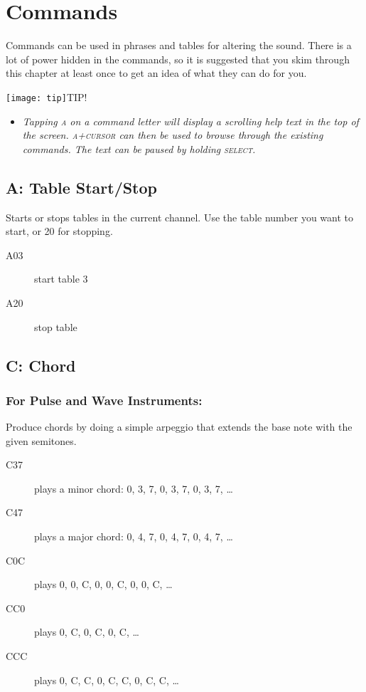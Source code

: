 \chapter{Commands}

Commands can be used in phrases and tables for altering the sound. There is a lot of power hidden in the commands, so it is suggested that you skim through this chapter at least once to get an idea of what they can do for you.

\texttt{[image: tip]}TIP!
\begin{itemize}
        \item \textit{Tapping \textsc{a} on a command letter will display a scrolling help text in the top of the screen. \textsc{a+cursor} can then be used to browse through the existing commands. The text can be paused by holding \textsc{select}.}
	\end{itemize}

\section{A: Table Start/Stop}

Starts or stops tables in the current channel. Use the table number you want to start, or 20 for stopping.

\begin{description}
\item[A03] start table 3
\item[A20] stop table
\end{description}

\section{C: Chord}

\subsection{For Pulse and Wave Instruments:}

\label{command-chord}
Produce chords by doing a simple arpeggio that extends the base note with the given semitones.

\begin{description}
\item[C37] plays a minor chord: 0, 3, 7, 0, 3, 7, 0, 3, 7, \ldots
\item[C47] plays a major chord: 0, 4, 7, 0, 4, 7, 0, 4, 7, \ldots
\item[C0C] plays 0, 0, C, 0, 0, C, 0, 0, C, \ldots
\item[CC0] plays 0, C, 0, C, 0, C, \ldots
\item[CCC] plays 0, C, C, 0, C, C, 0, C, C, \ldots
\end{description}

